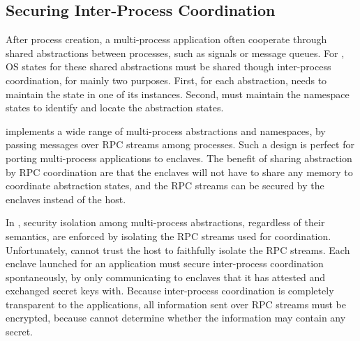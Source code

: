 \subsection{Securing Inter-Process Coordination}
\label{sec:multiproc:ipc}

After process creation, a multi-process application often cooperate
through shared abstractions between processes,
such as signals or message queues.
For \libos{}, OS states for these shared abstractions must be shared
though inter-process coordination, for mainly two purposes.
First, for each abstraction, \libos{} needs to maintain the state
in one of its instances.
Second, \libos{} must maintain the namespace states to identify and locate the
abstraction states.

\graphene{} implements a wide range of multi-process abstractions and namespaces,
by passing messages over RPC streams among processes.
Such a design is perfect for porting multi-process applications to enclaves.
The benefit of sharing abstraction by RPC coordination are that
the enclaves will not have to share any memory to
coordinate abstraction states,
and the RPC streams can be secured by the enclaves instead of the host.

In \graphene{}, security isolation among multi-process abstractions,
regardless of their semantics,
are enforced by isolating the RPC streams used for coordination.
Unfortunately, \sysname{} cannot trust the host to faithfully isolate
the RPC streams.
Each enclave launched for an application must secure inter-process coordination
spontaneously, by only communicating to enclaves that it has attested
and exchanged secret keys with.
Because inter-process coordination is completely transparent
to the applications,
all information sent over RPC streams must be encrypted,
because \libos{} cannot determine whether the information may contain any secret.





